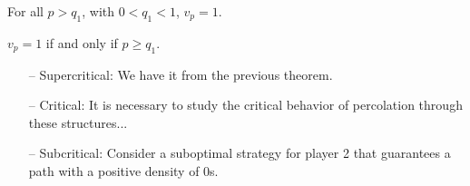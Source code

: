 \documentclass[11pt, mathserif]{beamer}
\begin{document}
   



    \begin{frame}
        \begin{theorem}\label{conjecture-v0-p0}
            For all $p > q_1$, with $0 < q_1 < 1$, $v_p = 1$.
        \end{theorem}
        \vspace{0.5cm}

         \begin{conjecture}\label{conjecture-v0-q0}
           $v_p = 1$ if and only if $p \geq q_1$.
         \end{conjecture}

         \vspace{0.5cm}
         \begin{itemize}
            \item[--] Supercritical: We have it from the previous theorem.
            \item[--] Critical: It is necessary to study the critical behavior of percolation through these structures...
            \item[--] Subcritical: Consider a suboptimal strategy for player 2 that guarantees a path with a positive density of 0s.
         \end{itemize}
    \end{frame}
\end{document}
